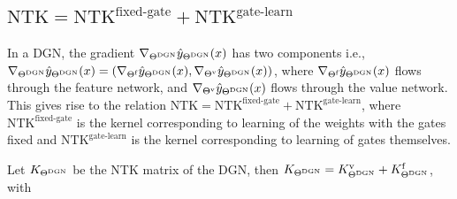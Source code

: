 \subsection{$\text{NTK}=\text{NTK}^{\text{fixed-gate}}+\text{NTK}^{\text{gate-learn}}$}
In a DGN, the gradient $\nabla_{\Theta^{\text{DGN}}}\hat{y}_{\Theta^{\text{DGN}}}(x)$ has two components i.e., $\nabla_{\Theta^{\text{DGN}}}\hat{y}_{\Theta^{\text{DGN}}}(x)=\left(\nabla_{\Theta^{\textrm{f}}}\hat{y}_{\Theta^{\text{DGN}}}(x),\nabla_{{\Theta}^{\text{v}}}\hat{y}_{\Theta^{\text{DGN}}}(x) \right)$, where $\nabla_{\Theta^{\textrm{f}}}\hat{y}_{\Theta^{\text{DGN}}}(x)$ flows through the feature network, and $\nabla_{{\Theta}^{\text{v}}}\hat{y}_{\Theta^{\text{DGN}}}(x)$ flows through the value network. This gives rise to the relation $\text{NTK}=\text{NTK}^{\text{fixed-gate}}+\text{NTK}^{\text{gate-learn}}$, where $\text{NTK}^{\text{fixed-gate}}$ is the kernel corresponding to learning of the weights with the gates fixed and $\text{NTK}^{\text{gate-learn}}$ is the kernel corresponding to learning of gates themselves. 
\begin{proposition}\label{prop:ntks} Let $K_{\Theta^{\text{DGN}}}$ be the NTK matrix of the DGN, then $K_{\Theta^{\text{DGN}}}=K^{\text{v}}_{\Theta^{\text{DGN}}}+K^{\text{f}}_{\Theta^{\text{DGN}}}$, with
\end{proposition}
